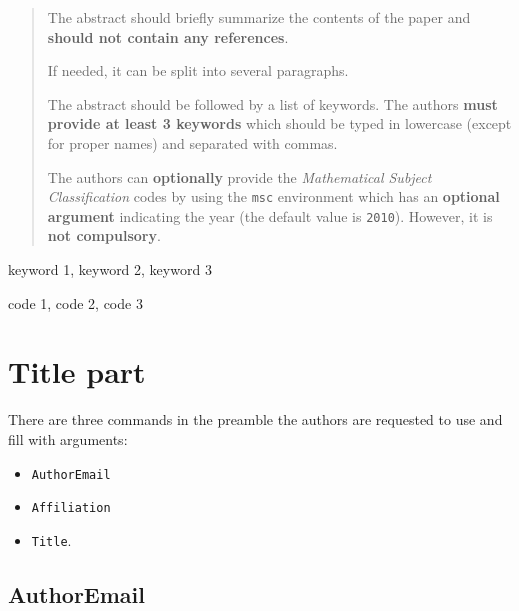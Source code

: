 \documentclass[manuscript]{BSLstyle} %
\begin{document}
	\begin{abstract}
		The abstract should briefly summarize the contents of the paper and \textbf{should not contain any references}.
		
		If needed, it can be split into several paragraphs.
		
		The abstract should be followed by a list of keywords. The authors \textbf{must provide at least 3 keywords} which should be typed in lowercase (except for proper names) and separated with commas.
		
		The authors can \textbf{optionally} provide the \textit{Mathematical Subject Classification} codes by using the \texttt{msc} environment which has an \textbf{optional argument} indicating the year (the default value is \texttt{2010}). However, it is \textbf{not compulsory}.
	\end{abstract}
	\begin{keywords}
		keyword 1, keyword 2, keyword 3
	\end{keywords}
	\begin{msc}[2020]
		code 1, code 2, code 3
	\end{msc}


\section{Title part}

There are three commands in the preamble the authors are requested to use and fill with arguments:
\begin{itemize}
	\item \texttt{AuthorEmail}
	\item \texttt{Affiliation}
	\item \texttt{Title}.
\end{itemize}

\subsection{AuthorEmail}
\end{document}
